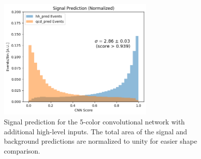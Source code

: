 \begin{figure}[!h] 
\begin{center}
  \includegraphics[width = 3in]{CNN/figures/5color_0PU_pix31_addHT-nJets-nBTags_2Conv16-16_one2DPool_EqualSamples/signal_CNNScore_norm}
\caption{Signal prediction for the 5-color convolutional network with additional high-level inputs. The total area of the signal and background predictions are normalized to unity for easier shape comparison.}
\end{center}
\label{fig:cnn_preds}
\end{figure}


